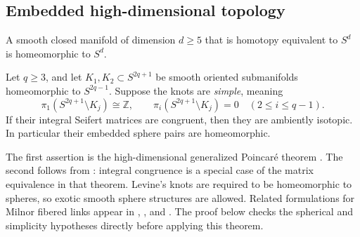 \subsection{Embedded high-dimensional topology}

\begin{theorem}\label{bg:classification}
A smooth closed manifold of dimension $d\geq5$ that is homotopy
equivalent to $S^d$ is homeomorphic to $S^d$.

Let $q\geq3$, and let $K_1,K_2\subset S^{2q+1}$ be smooth oriented
submanifolds homeomorphic to $S^{2q-1}$.  Suppose the knots are
\emph{simple}, meaning
\[
 \pi_1(S^{2q+1}\setminus K_j)\cong\mathbb Z,
 \qquad
 \pi_i(S^{2q+1}\setminus K_j)=0\quad(2\leq i\leq q-1).
\]
If their integral Seifert matrices are congruent, then they are
ambiently isotopic.  In particular their embedded sphere pairs are
homeomorphic.
\end{theorem}

The first assertion is the high-dimensional generalized Poincar\'e
theorem \cite[Theorem~A, p.~391]{Smale1961}.  The second follows from
\cite[Theorem~3, pp.~185--186]{Levine1970}: integral congruence is a
special case of the matrix equivalence in that theorem.  Levine's
knots are required to be homeomorphic to spheres, so exotic smooth
sphere structures are allowed.  Related formulations for Milnor
fibered links appear in \cite{Durfee1974},
\cite[pp.~698--699]{Saeki1999}, and
\cite[Section~2]{Neumann2017}.
The proof below checks the spherical and simplicity hypotheses
directly before applying this theorem.
